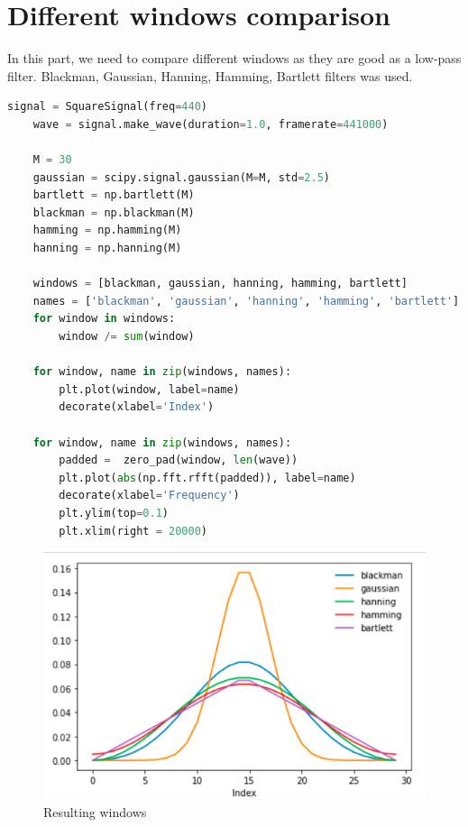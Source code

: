 \documentclass[a4paper]{article}
\begin{document}
    \newpage
        \section{Different windows comparison}
        
            In this part, we need to compare different windows as they are good as a low-pass filter. Blackman, Gaussian, Hanning, Hamming, Bartlett filters was used.
            
            \begin{lstlisting}[language=Python,caption=Plotting code,label={lst:part1_2}]
    signal = SquareSignal(freq=440)
    wave = signal.make_wave(duration=1.0, framerate=441000)
    
    M = 30
    gaussian = scipy.signal.gaussian(M=M, std=2.5)   
    bartlett = np.bartlett(M)
    blackman = np.blackman(M)
    hamming = np.hamming(M)
    hanning = np.hanning(M)
    
    windows = [blackman, gaussian, hanning, hamming, bartlett]
    names = ['blackman', 'gaussian', 'hanning', 'hamming', 'bartlett']
    for window in windows:
        window /= sum(window)
        
    for window, name in zip(windows, names):
        plt.plot(window, label=name)
        decorate(xlabel='Index')
    
    for window, name in zip(windows, names):
        padded =  zero_pad(window, len(wave))
        plt.plot(abs(np.fft.rfft(padded)), label=name)
        decorate(xlabel='Frequency')
        plt.ylim(top=0.1)
        plt.xlim(right = 20000)
        \end{lstlisting}
        
        \begin{figure}[H]
            \centering
            \includegraphics[width=\textwidth]{img/p3_1.png}
            \caption{Resulting windows}
            \label{fig:part1_1_2}
        \end{figure}
        
\end{document}
